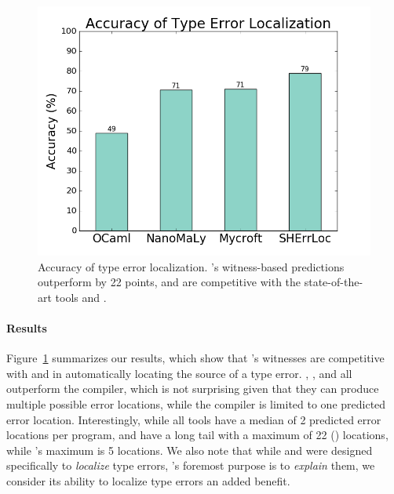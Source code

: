\begin{figure}[t]
\includegraphics[width=0.7\linewidth]{blame.png}
\caption{Accuracy of type error localization. \toolname's witness-based
  predictions outperform \ocaml by 22 points, and are competitive
  with the state-of-the-art tools \mycroft and \sherrloc.}
\label{fig:results-blame}
\end{figure}

\paragraph{Results}
Figure~\ref{fig:results-blame} summarizes our results, which show that
\toolname's witnesses are competitive with \mycroft and \sherrloc in
automatically locating the source of a type error.
%
\toolname, \mycroft, and \sherrloc all outperform the \ocaml compiler,
which is not surprising given that they can produce multiple possible
error locations, while the \ocaml compiler is limited to one predicted
error location.
%
Interestingly, while all tools have a median of 2 predicted error
locations per program, \mycroft and \sherrloc have a long tail with a
maximum of 22 () locations, while \toolname's maximum is 5
locations.
%
We also note that while \mycroft and \sherrloc were designed
specifically to \emph{localize} type errors, \toolname's foremost
purpose is to \emph{explain} them, we consider its ability to localize
type errors an added benefit.


